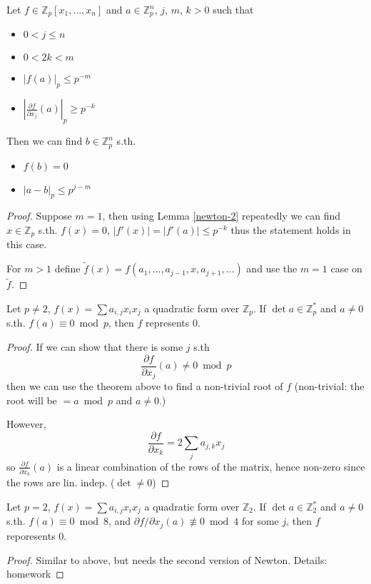 \begin{theorem}
  Let $f\in \mathbb Z_p[x_1, \ldots, x_n]$ and $a\in \mathbb Z_p^n$, $j$, $m$, $k>0$ such
  that 
  \begin{itemize}
    \item $0<j\le n$
    \item $0<2k<m$
    \item $|f(a)|_p\le p^{-m}$
    \item $|\frac{\partial f}{\partial x_j}(a)|_p\ge p^{-k}$
  \end{itemize}
  Then we can find $b\in\mathbb Z_p^n$ s.th.
  \begin{itemize}
    \item $f(b) = 0$
    \item $|a-b|_p \le p^{j-m}$
  \end{itemize}
\end{theorem}
\begin{proof}
  Suppose $m=1$, then using Lemma \ref{newton-2} repeatedly we can find
  $x\in \mathbb Z_p$ s.th. $f(x) = 0$, $|f'(x)| = |f'(a)| \le p^{-k}$
  thus the statement holds in this case.

  For $m>1$ define $\tilde f(x) = f(a_1, \ldots, a_{j-1}, x, a_{j+1}, \ldots)$
  and use the $m=1$ case on $\tilde f$.

\end{proof}

\begin{korollar}
  Let $p\ne 2$, $f(x) = \sum a_{i,j} x_i x_j$ a quadratic form over $\mathbb Z_p$.
  If $\det a\in \mathbb Z_p^*$ and $a\ne 0$ s.th. $f(a)\equiv 0 \bmod p$, then $f$
  represents $0$.
\end{korollar}
\begin{proof}
  If we can show that there is some $j$ s.th
  $$\frac{\partial f}{\partial x_j}(a) \ne 0 \bmod p$$
  then we can use the theorem above to find a non-trivial root of $f$
  (non-trivial: the root will be $=a \bmod p$ and $a\ne 0$.)

  However, 
  $$\frac{\partial f}{\partial x_k} = 2\sum_j a_{j,k}x_j$$
  so $\frac{\partial f}{\partial x_k}(a)$ is a linear combination of the
  rows of the matrix, hence non-zero since the rows are lin. indep. ($\det\ne 0$)

\end{proof}

\begin{korollar}
  Let $p = 2$, $f(x) = \sum a_{i,j} x_i x_j$ a quadratic form over $\mathbb Z_2$.
  If $\det a\in \mathbb Z_2^*$ and $a\ne 0$ s.th. $f(a)\equiv 0 \bmod 8$, 
  and $\partial f/\partial x_j (a) \not\equiv 0 \bmod 4$ for some $j$, then $f$
  reporesents $0$.
\end{korollar}
\begin{proof}
  Similar to above, but needs the second version of Newton. Details: homework
\end{proof}

